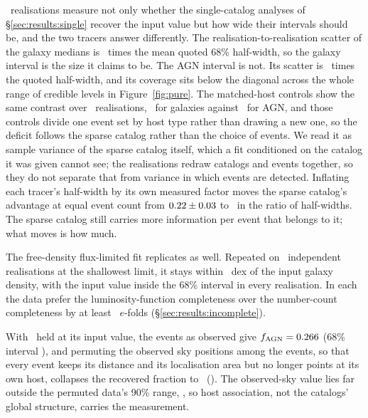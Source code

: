 \PureNseeds\ realisations measure not only whether the single-catalog
analyses of \S\ref{sec:results:single} recover the input value but how wide
their intervals should be, and the two tracers answer differently. The
realisation-to-realisation scatter of the galaxy medians is \EnsGalRatio\
times the mean quoted 68\% half-width, so the galaxy interval is the size it
claims to be. The AGN interval is not. Its scatter is \EnsAgnRatio\ times the
quoted half-width, and its coverage sits below the diagonal across the whole
range of credible levels in Figure~\ref{fig:pure}. The matched-host controls
show the same contrast over \EnsCtrlNseeds\ realisations, \EnsCtrlGalRatio\
for galaxies against \EnsCtrlAgnRatio\ for AGN, and those controls divide one
event set by host type rather than drawing a new one, so the deficit follows
the sparse catalog rather than the choice of events. We read it as sample
variance of the sparse catalog itself, which a fit conditioned on the catalog
it was given cannot see; the realisations redraw catalogs and events together,
so they do not separate that from variance in which events are detected.
Inflating each tracer's half-width by its own measured factor moves the sparse
catalog's advantage at equal event count from $0.22 \pm 0.03$ to
\EnsWidthRatioCorrected\ in the ratio of half-widths. The sparse catalog still
carries more information per event that belongs to it; what moves is how much.

The free-density flux-limited fit replicates as well. Repeated on
\NSeedsIncomplete\ independent
realisations at the shallowest limit, it stays within
\GalAnchorOffsetMaxDex~dex of the input galaxy
density, with the input value inside the 68\% interval in every realisation.
In each the data prefer the luminosity-function completeness over the
number-count completeness by at least \SeedLnBFmin\ $e$-folds
(\S\ref{sec:results:incomplete}).

With \Hz\ held at its input value, the events as observed give
$f_{\rm AGN} = 0.266$ (68\% interval \FagnRecordCi), and permuting the
observed sky positions among the events, so that every event keeps its
distance and its localisation area but no longer points at its own host,
collapses the recovered fraction to \FagnNull\ (\FagnNullCi). The
observed-sky value lies far outside the permuted data's 90\% range,
\FagnNullCiNinety, so host association, not the catalogs' global structure,
carries the measurement.


